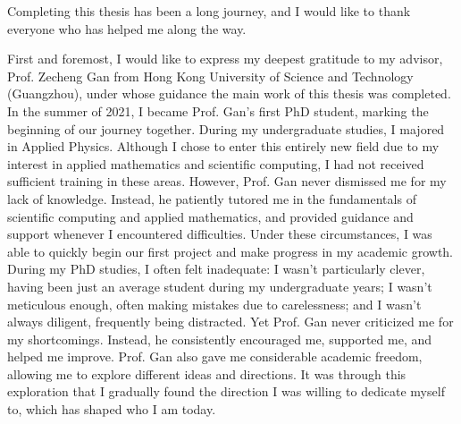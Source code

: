 
Completing this thesis has been a long journey, and I would like to thank everyone who has helped me along the way.

First and foremost, I would like to express my deepest gratitude to my advisor, Prof. Zecheng Gan from Hong Kong University of Science and Technology (Guangzhou), under whose guidance the main work of this thesis was completed.
In the summer of 2021, I became Prof. Gan's first PhD student, marking the beginning of our journey together.
During my undergraduate studies, I majored in Applied Physics. 
Although I chose to enter this entirely new field due to my interest in applied mathematics and scientific computing, I had not received sufficient training in these areas.
However, Prof. Gan never dismissed me for my lack of knowledge. Instead, he patiently tutored me in the fundamentals of scientific computing and applied mathematics, and provided guidance and support whenever I encountered difficulties.
Under these circumstances, I was able to quickly begin our first project and make progress in my academic growth.
During my PhD studies, I often felt inadequate: I wasn't particularly clever, having been just an average student during my undergraduate years; I wasn't meticulous enough, often making mistakes due to carelessness; and I wasn't always diligent, frequently being distracted.
Yet Prof. Gan never criticized me for my shortcomings. 
Instead, he consistently encouraged me, supported me, and helped me improve.
Prof. Gan also gave me considerable academic freedom, allowing me to explore different ideas and directions. 
It was through this exploration that I gradually found the direction I was willing to dedicate myself to, which has shaped who I am today.


